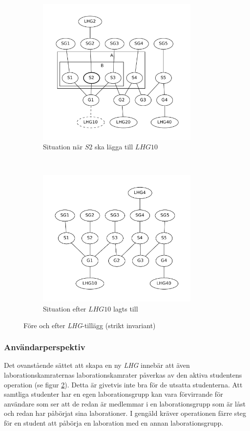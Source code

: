 \begin{figure}
  \centering
  \begin{subfigure}[b]{0.5\textwidth}
    \centering
    \includegraphics[width=8.0cm]{fig/labgroup/strict_proof.pdf}
    \caption{Situation när $S2$ ska lägga till $LHG10$}
    \label{fig:strict-proof}
  \end{subfigure}%
        ~ %
  \begin{subfigure}[b]{0.5\textwidth}
    \centering
    \includegraphics[width=8.0cm]{fig/labgroup/strict_proof_continue.pdf}
    \caption{Situation efter $LHG10$ lagts till}
    \label{fig:strict-proof-continue}
  \end{subfigure}
  \caption{Före och efter \emph{LHG}-tillägg (strikt invariant)}\label{fig:animals}
\end{figure}

\subsubsection{Användarperspektiv}
Det ovanstående sättet att skapa en ny \emph{LHG} innebär att även laborationskamraternas laborationskamrater påverkas av den aktiva studentens operation (se figur \ref{fig:strict-proof-continue}). Detta är givetvis inte bra för de utsatta studenterna. Att samtliga studenter har en egen laborationsgrupp kan vara förvirrande för användare som ser att de redan är medlemmar i en laborationsgrupp som är låst och redan har påbörjat sina laborationer. I gengäld kräver operationen färre steg för en student att påbörja en laboration med en annan laborationsgrupp.

